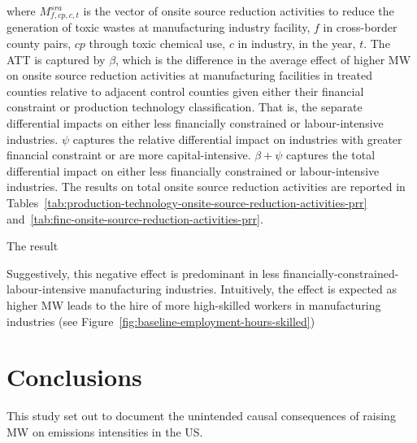 \documentclass[12pt, english]{article}
\begin{document}
    where $M_{f,cp,c,t}^{sra}$ is the vector of onsite source reduction activities to reduce the generation of toxic wastes at manufacturing industry facility, $f$ in cross-border county pairs, $cp$ through toxic chemical use, $c$ in industry, in the year, $t$. The ATT is captured by $\beta$, which is the difference in the average effect of higher MW on onsite source reduction activities at manufacturing facilities in treated counties relative to adjacent control counties given either their financial constraint or production technology classification. That is, the separate differential impacts on either less financially constrained or labour-intensive industries. $\psi$ captures the relative differential impact on industries with greater financial constraint or are more capital-intensive. $\beta + \psi$ captures the total differential impact on either less financially constrained or labour-intensive industries.
    The results on total onsite source reduction activities are reported in Tables~\ref{tab:production-technology-onsite-source-reduction-activities-prr} and~\ref{tab:finc-onsite-source-reduction-activities-prr}.

The result
    
    

    Suggestively, this negative effect is predominant in less financially-constrained-labour-intensive manufacturing industries. Intuitively, the effect is expected as higher MW leads to the hire of more high-skilled workers in manufacturing industries (see Figure~\ref{fig:baseline-employment-hours-skilled})


    \section{Conclusions}\label{sec:conclusions}
    This study set out to document the unintended causal consequences of raising MW on emissions intensities in the US.
\end{document}

